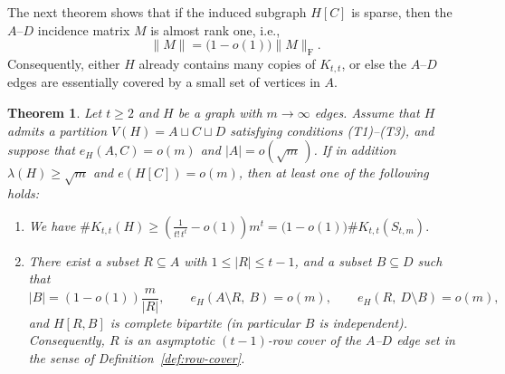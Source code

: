 \documentclass[10pt,a4paper]{amsart}
\newtheorem{theorem}{Theorem}[section]
\newcommand{\Ktt}{K_{t,t}}
\begin{document}
The next theorem shows that if the induced subgraph $H[C]$ is sparse, then the $A$--$D$ incidence matrix \(M\) is almost rank one, i.e.,
\[
        \|M\| =\bigl(1- o(1) \bigr) \|M\|_{\mathrm{F}}.
\]
Consequently, either $H$ already
contains many copies of $\Ktt$, or else the $A$--$D$ edges are essentially covered by a small set of vertices in $A$.


\begin{theorem} \label{thm:sparseC-rowcover}
Let $t\ge 2$ and $H$ be a graph with $m \to\infty$ edges. 
Assume that $H$ admits a partition $V(H)=A\sqcup C\sqcup D$ satisfying conditions \textup{(T1)}--\textup{(T3)},
and suppose that $e_H(A,C)=o(m)$ and  $|A|=o(\sqrt{m}\,)$. 
If in addition $\lambda (H)\ge \sqrt{m}$ and  $e(H[C])=o(m)$, 
then at least one of the following holds:
\begin{enumerate}
  \item[\rm(i)] We have $\texttt{\#}\Ktt(H)
     \ge 
    \left(\frac{1}{t!\,t^t}-o(1)\right) m^t 
    =\big( 1-o(1) \big)\texttt{\#}K_{t,t}(S_{t,m}).$

  \item[\rm(ii)]  There exist a subset $R\subseteq A$ with $1\le |R|\le t-1$, and a subset $B\subseteq D$ such that
  \[
    |B|=(1-o(1))\frac{m}{|R|},
    \qquad
    e_H(A\setminus R,\ B)=o(m),
    \qquad
    e_H(R,\ D\setminus B)=o(m),
  \]
  and $H[R,B]$ is complete bipartite (in particular $B$ is independent).
  Consequently, $R$ is an asymptotic $(t\!-\!1)$-row cover of the $A$--$D$ edge set in the sense of Definition~\ref{def:row-cover}.
\end{enumerate} 
\end{theorem}
\end{document}
